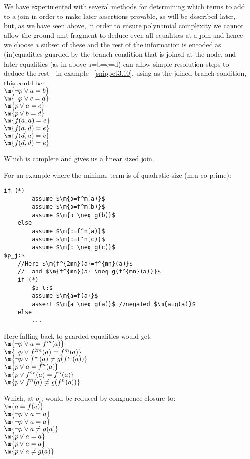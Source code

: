 We have experimented with several methods for determining which terms to add to a join in order to make later assertions provable, as will be described later, but, as we have seen above, in order to ensure polynomial complexity we cannot allow the ground unit fragment to deduce even all equalities at a join and hence we choose a subset of these and the rest of the information is encoded as (in)equalities guarded by the branch condition that is joined at the node, and later equalities (as in above a=b=c=d) can allow simple resolution steps to deduce the rest - in example ~\ref{snippet3.10}, using  as the joined branch condition, this could be:\\
$\m{\lnot p \lor a=b}$\\
$\m{\lnot p \lor c=d}$\\
$\m{p \lor a=c}$\\
$\m{p \lor b=d}$\\
$\m{f(a,a)=e}$\\
$\m{f(a,d)=e}$\\
$\m{f(d,a)=e}$\\
$\m{f(d,d)=e}$

Which is complete and gives us a linear sized join.

For an example where the minimal term is of quadratic size (m,n co-prime):
\begin{lstlisting}[caption=congruence closure source quadratic depth,label=snippet3.11]
	if (*)
		assume $\m{b=f^m(a)}$
		assume $\m{b=f^m(b)}$
		assume $\m{b \neq g(b)}$
	else
		assume $\m{c=f^n(a)}$
		assume $\m{c=f^n(c)}$
		assume $\m{c \neq g(c)}$
$p_j:$
	//Here $\m{f^{2mn}(a)=f^{mn}(a)}$
	//  and $\m{f^{mn}(a) \neq g(f^{mn}(a))}$
	if (*)
		$p_t:$
		assume $\m{a=f(a)}$
		assert $\m{a \neq g(a)}$ //negated $\m{a=g(a)}$
	else
		...
\end{lstlisting}

Here falling back to guarded equalities would get:\\
$\m{\lnot p \lor a=f^m(a)}$\\
$\m{\lnot p \lor f^{2m}(a)=f^m(a)}$\\
$\m{\lnot p \lor f^{m}(a)\neq g(f^{m}(a))}$\\
$\m{      p \lor a=f^n(a)}$\\
$\m{      p \lor f^{2n}(a)=f^n(a)}$\\
$\m{      p \lor f^{n}(a)\neq g(f^{n}(a))}$

Which, at $p_t$, would be reduced by congruence closure to:\\
$\m{a=f(a)}$\\
$\m{\lnot p \lor a=a}$\\
$\m{\lnot p \lor a=a}$\\
$\m{\lnot p \lor a \neq g(a)}$\\
$\m{      p \lor a=a}$\\
$\m{      p \lor a=a}$\\
$\m{      p \lor a\neq g(a)}$

